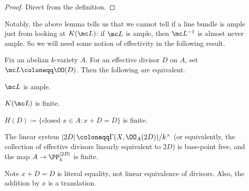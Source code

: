 \documentclass[../notes.tex]{subfiles}
\begin{document}
\begin{proof}
	Direct from the definition.
\end{proof}
Notably, the above lemma tells us that we cannot tell if a line bundle is ample just from looking at $K(\mc L)$: if $\mc L$ is ample, then $\mc L^{-1}$ is almost never ample. So we will need some notion of effectivity in the following result.
\begin{theorem} \label{thm:get-ample}
	Fix an abelian $k$-variety $A$. For an effective divisor $D$ on $A$, set $\mc L\coloneqq\OO(D)$. Then the following are equivalent.
	\begin{listalph}
		\item $\mc L$ is ample.
		\item $K(\mc L)$ is finite.
		\item $H(D)\coloneqq\{\text{closed }x\in A:x+D=D\}$ is finite.
		\item The linear system $\left|2D\right|\coloneqq\Gamma(X,\OO_A(2D))/k^\times$ (or equivalently, the collection of effective divisors linearly equivalent to $2D$) is base-point free, and the map $A\to\PP^{\left|2D\right|}_k$ is finite.
	\end{listalph}
\end{theorem}
Note $x+D=D$ is literal equality, not linear equivalence of divisors. Also, the addition by $x$ is a translation.
\end{document}
